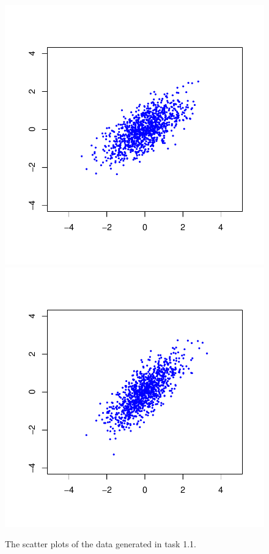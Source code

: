 \documentclass{article}
\begin{document}
\begin{figure}
	\includegraphics[scale=\sscale]{scatter3}
	\includegraphics[scale=\sscale]{scatter4}
	\caption{The scatter plots of the data generated in task 1.1.} \label{fig:scatter}
\end{figure}
\end{document}
